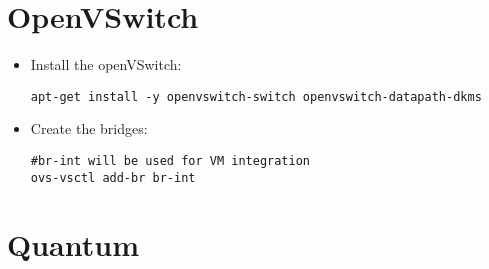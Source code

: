 \section{OpenVSwitch}
\label{openvswitch}

\begin{itemize}
\item Install the openVSwitch:

\begin{verbatim}
apt-get install -y openvswitch-switch openvswitch-datapath-dkms
\end{verbatim}


\item Create the bridges:

\begin{verbatim}
#br-int will be used for VM integration  
ovs-vsctl add-br br-int
\end{verbatim}


\end{itemize}

\section{Quantum}
\label{quantum}

